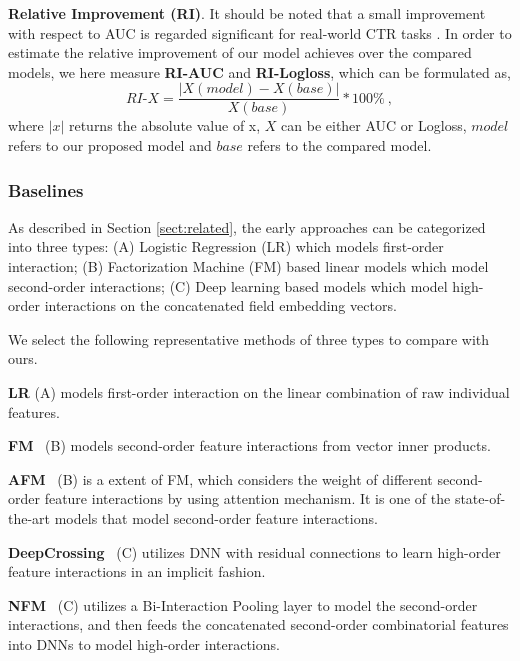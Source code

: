 \documentclass[sigconf]{acmart}
\begin{document}
\textbf{Relative Improvement (RI)}. It should be noted that a small improvement with respect to AUC is regarded significant for real-world CTR tasks \cite{cheng2016wide,guo2017deepfm,wang2017deep,lian2018xdeepfm}. 
In order to estimate the relative improvement of our model achieves over the compared models, we here measure \textbf{RI-AUC} and \textbf{RI-Logloss}, which can be formulated as,
\begin{equation}
\textit{RI}\text{-}\textit{X} = \dfrac {\left |\textit{X}(model)-\textit{X}(base) \right |}{\textit{X}(base)} *100\%~,
\end{equation}
where $\left | x \right |$ returns the absolute value of x, $X$ can be either AUC or Logloss, $\textit{model}$ refers to our proposed model and $\textit{base}$ refers to the compared model.




\subsubsection{Baselines} 
As described in Section \ref{sect:related}, 
the early approaches can be categorized into three types: 
(A) Logistic Regression (LR) which models first-order interaction;
(B) Factorization Machine (FM) based linear models which model second-order interactions; 
(C) Deep learning based models which model high-order interactions on the concatenated field embedding vectors. 

We select the following representative methods of three types to compare with ours.

\textbf{LR} (A) models first-order interaction on the linear combination of raw individual features.  

\textbf{FM}~\cite{rendle2010factorization} (B) models second-order feature interactions from vector inner products. 

\textbf{AFM}~\cite{xiao2017attentional} (B) is a extent of FM, which considers the weight of different second-order feature interactions by using attention mechanism.
It is one of the state-of-the-art models that model second-order feature interactions. 

\textbf{DeepCrossing}~\cite{shan2016deep} (C) utilizes DNN with residual connections to learn high-order feature interactions in an implicit fashion.


\textbf{NFM}~\cite{he2017neural} (C) utilizes a Bi-Interaction Pooling layer to model the second-order interactions, and then feeds the concatenated second-order combinatorial features into DNNs to model high-order interactions.
\end{document}
